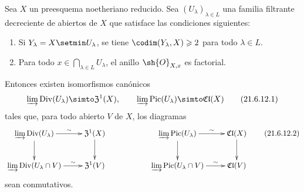 \begin{proposition}[21.6.12]
\label{IV.21.6.12}
Sea $X$ un preesquema noetheriano reducido.
Sea $(U_\lambda)_{\lambda\in L}$ una familia filtrante decreciente de abiertos de $X$ que satisface las condiciones siguientes:
\begin{enumerate}
  \item[\rm 1\textsuperscript{o}] Si $Y_\lambda=X\setmin U_\lambda$, se tiene $\codim(Y_\lambda,X)\geq2$ para todo $\lambda\in L$.
  \item[\rm 2\textsuperscript{o}] Para todo $x\in\bigcap_{\lambda\in L}U_\lambda$, el anillo $\sh{O}_{X,x}$ es factorial.
\end{enumerate}
Entonces existen isomorfismos canónicos
\[
\label{IV.21.6.12.1}
  \varinjlim\operatorname{Div}(U_\lambda)\simto\mathfrak{Z}^1(X),\qquad
  \varinjlim\operatorname{Pic}(U_\lambda)\simto\mathfrak{Cl}(X)
  \tag{21.6.12.1}
\]
tales que, para todo abierto $V$ de $X$, los diagramas
\[
\label{IV.21.6.12.2}
  \xymatrix{
    \varinjlim\operatorname{Div}(U_\lambda) \ar[r]^-\sim \ar[d] & \mathfrak{Z}^1(X) \ar[d] & & \varinjlim\operatorname{Pic}(U_\lambda) \ar[r]^-\sim \ar[d] & \mathfrak{Cl}(X) \ar[d]\\
    \varinjlim\operatorname{Div}(U_\lambda\cap V) \ar[r]^-\sim & \mathfrak{Z}^1(V) & & \varinjlim\operatorname{Pic}(U_\lambda\cap V) \ar[r]^-\sim & \mathfrak{Cl}(V)
  }
  \tag{21.6.12.2}
\]
sean conmutativos.
\end{proposition}

